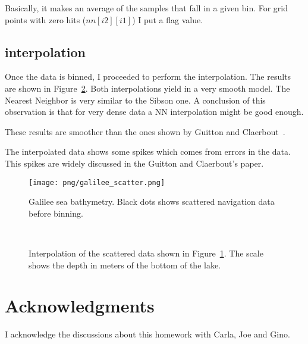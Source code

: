 \documentclass[10pt]{article}
\begin{document}
Basically, it makes an average of the samples that fall in a given bin. For grid points with 
zero hits ($nn[i2][i1]$) I put a flag value.

\subsection{interpolation}

Once the data is binned, I proceeded to perform the interpolation. The results are shown in Figure~\ref{fig:gal2}.
Both interpolations yield in a very smooth model. The Nearest Neighbor is very similar to the Sibson one. 
A conclusion of this observation is that for very dense data a NN interpolation might be good enough.

These results are smoother than the ones shown by Guitton and Claerbout~\cite{guitton_galilee}.

The interpolated data shows some spikes which comes from errors in the data. This spikes are
widely discussed in the Guitton and Claerbout's paper. 


\begin{figure}
    \centering
    \texttt{[image: png/galilee\_scatter.png]}
    \caption{Galilee sea bathymetry. Black dots shows scattered navigation data before binning.}
    \label{fig:gal1}
\end{figure}



\begin{figure}[ht!]
     \begin{center}
%
        \\ %
%
    \end{center}
    \caption{Interpolation of the scattered data shown in Figure~\ref{fig:gal1}. The scale shows%
            the depth in meters of the bottom of the lake.}
   \label{fig:gal2}
\end{figure}



\section{Acknowledgments}
I acknowledge the discussions about this homework with Carla, Joe and Gino.

\clearpage


\end{document}
